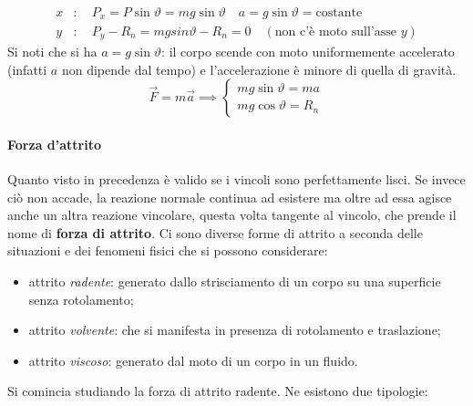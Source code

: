 \documentclass[10pt,a4paper]{book}
\begin{document}
\begin{align*}
	x&: \quad P_x=P\sin\vartheta=mg\sin\vartheta \quad a=g\sin\vartheta=\text{costante} \\
	y&: \quad P_y-R_n=mgsin\vartheta-R_n=0 \quad (\text{non c'è moto sull'asse $y$})
\end{align*}
Si noti che si ha $a=g\sin\vartheta$: il corpo scende con moto uniformemente accelerato (infatti $a$ non dipende dal tempo) e l'accelerazione è minore di quella di gravità.
\[
	\vec{F}=m\vec{a} \implies \begin{cases} mg\sin\vartheta=ma \\ mg\cos\vartheta=R_n \end{cases}
\]

\paragraph{Forza d'attrito} Quanto visto in precedenza è valido se i vincoli sono perfettamente lisci. Se invece ciò non accade, la reazione normale continua ad esistere ma oltre ad essa agisce anche un altra reazione vincolare, questa volta tangente al vincolo, che prende il nome di \textbf{forza di attrito}. Ci sono diverse forme di attrito a seconda delle situazioni e dei fenomeni fisici che si possono considerare:
\begin{itemize}
	\item attrito \emph{radente}: generato dallo strisciamento di un corpo su una superficie senza rotolamento;
	\item attrito \emph{volvente}: che si manifesta in presenza di rotolamento e traslazione;
	\item attrito \emph{viscoso}: generato dal moto di un corpo in un fluido.
\end{itemize}
Si comincia studiando la forza di attrito radente. Ne esistono due tipologie:
\end{document}
